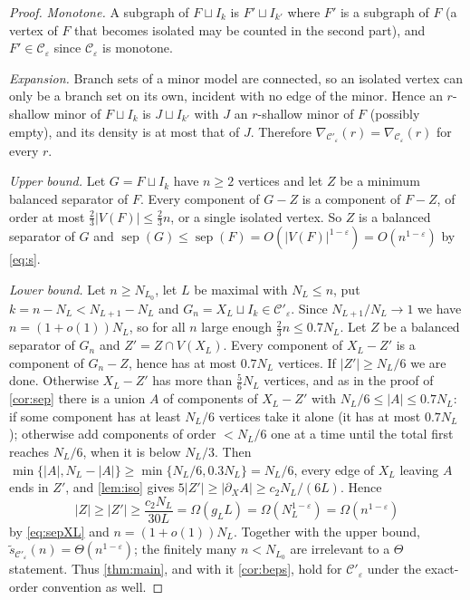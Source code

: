 \documentclass[11pt,a4paper]{article}
\theoremstyle{plain}
\theoremstyle{definition}
\theoremstyle{remark}
\newcommand{\sep}{\operatorname{sep}}
\newcommand{\cC}{\mathcal C}
\begin{document}
\label{pf:exact}
\propexact*
\begin{proof}
\emph{Monotone.} A subgraph of $F\sqcup I_k$ is $F'\sqcup I_{k'}$ where $F'$ is a subgraph of $F$ (a vertex of $F$ that becomes isolated may be counted in the second part), and $F'\in\cC_\varepsilon$ since $\cC_\varepsilon$ is monotone.

\emph{Expansion.} Branch sets of a minor model are connected, so an isolated vertex can only be a branch set on its own, incident with no edge of the minor. Hence an $r$-shallow minor of $F\sqcup I_k$ is $J\sqcup I_{k'}$ with $J$ an $r$-shallow minor of $F$ (possibly empty), and its density is at most that of $J$. Therefore $\nabla_{\cC'_\varepsilon}(r)=\nabla_{\cC_\varepsilon}(r)$ for every $r$.

\emph{Upper bound.} Let $G=F\sqcup I_k$ have $n\ge2$ vertices and let $Z$ be a minimum balanced separator of $F$. Every component of $G-Z$ is a component of $F-Z$, of order at most $\frac23|V(F)|\le\frac23n$, or a single isolated vertex. So $Z$ is a balanced separator of $G$ and $\sep(G)\le\sep(F)=O(|V(F)|^{1-\varepsilon})=O(n^{1-\varepsilon})$ by \eqref{eq:s}.

\emph{Lower bound.} Let $n\ge N_{L_0}$, let $L$ be maximal with $N_L\le n$, put $k=n-N_L<N_{L+1}-N_L$ and $G_n=X_L\sqcup I_k\in\cC'_\varepsilon$. Since $N_{L+1}/N_L\to1$ we have $n=(1+o(1))N_L$, so for all $n$ large enough $\frac23n\le0.7N_L$. Let $Z$ be a balanced separator of $G_n$ and $Z'=Z\cap V(X_L)$. Every component of $X_L-Z'$ is a component of $G_n-Z$, hence has at most $0.7N_L$ vertices. If $|Z'|\ge N_L/6$ we are done. Otherwise $X_L-Z'$ has more than $\frac56N_L$ vertices, and as in the proof of \cref{cor:sep} there is a union $A$ of components of $X_L-Z'$ with $N_L/6\le|A|\le0.7N_L$: if some component has at least $N_L/6$ vertices take it alone (it has at most $0.7N_L$); otherwise add components of order $<N_L/6$ one at a time until the total first reaches $N_L/6$, when it is below $N_L/3$. Then $\min\{|A|,N_L-|A|\}\ge\min\{N_L/6,0.3N_L\}=N_L/6$, every edge of $X_L$ leaving $A$ ends in $Z'$, and \cref{lem:iso} gives $5|Z'|\ge|\partial_XA|\ge c_2N_L/(6L)$. Hence
\[
 |Z|\ge|Z'|\ge\frac{c_2N_L}{30L}=\Omega(g_LL)=\Omega(N_L^{1-\varepsilon})=\Omega(n^{1-\varepsilon})
\]
by \eqref{eq:sepXL} and $n=(1+o(1))N_L$. Together with the upper bound, $\tilde s_{\cC'_\varepsilon}(n)=\Theta(n^{1-\varepsilon})$; the finitely many $n<N_{L_0}$ are irrelevant to a $\Theta$ statement. Thus \cref{thm:main}, and with it \cref{cor:beps}, hold for $\cC'_\varepsilon$ under the exact-order convention as well.
\end{proof}
\end{document}
